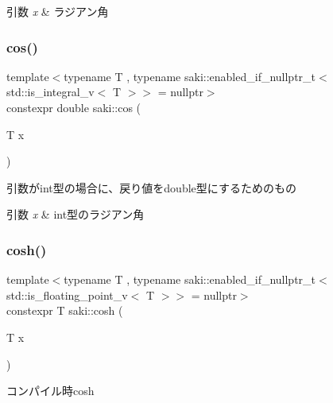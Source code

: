 \begin{DoxyParams}{引数}
{\em x} & ラジアン角 \\
\hline
\end{DoxyParams}
\mbox{\label{namespacesaki_ab1f49aa2d1182883ae8b4c01b346cc88}} 
\subsubsection{\texorpdfstring{cos()}{cos()}\hspace{0.1cm}{\footnotesize\ttfamily [2/2]}}
{\footnotesize\ttfamily template$<$typename T , typename saki\+::enabled\+\_\+if\+\_\+nullptr\+\_\+t$<$ std\+::is\+\_\+integral\+\_\+v$<$ T $>$$>$  = nullptr$>$ \\
constexpr double saki\+::cos (\begin{DoxyParamCaption}\item[{T}]{x }\end{DoxyParamCaption})}



引数がint型の場合に、戻り値をdouble型にするためのもの 


\begin{DoxyParams}{引数}
{\em x} & int型のラジアン角 \\
\hline
\end{DoxyParams}
\mbox{\label{namespacesaki_a0f8167af6da5c9eb510d33dadae13708}} 
\subsubsection{\texorpdfstring{cosh()}{cosh()}\hspace{0.1cm}{\footnotesize\ttfamily [1/2]}}
{\footnotesize\ttfamily template$<$typename T , typename saki\+::enabled\+\_\+if\+\_\+nullptr\+\_\+t$<$ std\+::is\+\_\+floating\+\_\+point\+\_\+v$<$ T $>$$>$  = nullptr$>$ \\
constexpr T saki\+::cosh (\begin{DoxyParamCaption}\item[{T}]{x }\end{DoxyParamCaption})}



コンパイル時cosh 

\mbox{\label{namespacesaki_afe248729248030bd5858469409e902d2}} 
